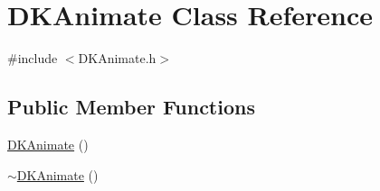 \hypertarget{class_d_k_animate}{\section{D\-K\-Animate Class Reference}
\label{class_d_k_animate}
}


{\ttfamily \#include $<$D\-K\-Animate.\-h$>$}

\subsection*{Public Member Functions}
\begin{DoxyCompactItemize}
\item 
\hyperlink{class_d_k_animate_aa24eda45b12ba3d7ffc06b3f412796ce}{D\-K\-Animate} ()
\item 
\hyperlink{class_d_k_animate_a5547194e148ea20280b14323e27c62a1}{$\sim$\-D\-K\-Animate} ()
\end{DoxyCompactItemize}

